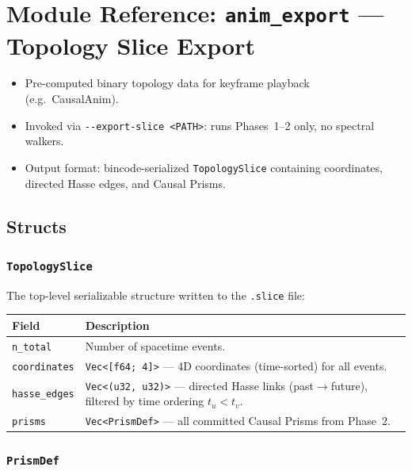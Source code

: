 \documentclass[11pt, a4paper, openany]{book}
\newcommand{\code}[1]{\texttt{#1}}
\newcommand{\modname}[1]{\texttt{\bfseries\color{main}#1}}
\newenvironment{introduction}[1][Chapter Overview]{%
  \begin{tcolorbox}[
    enhanced,colback=structure!5,colframe=structure,
    colbacktitle=structure,coltitle=white,
    fonttitle=\small\bfseries,title={#1},
    arc=2pt,boxrule=0.7pt,
    left=8pt,right=8pt,top=6pt,bottom=6pt,
    before skip=12pt,after skip=12pt
  ]\itshape\begin{itemize}[leftmargin=*,itemsep=2pt,parsep=0pt]
}{%
  \end{itemize}\end{tcolorbox}
}
\begin{document}
\chapter{Module Reference: \modname{anim\_export} --- Topology Slice Export}

\begin{introduction}[Binary Export for External Renderers]
  \item Pre-computed binary topology data for keyframe playback (e.g.\ CausalAnim).
  \item Invoked via \code{-{}-export-slice <PATH>}: runs Phases~1--2 only, no spectral walkers.
  \item Output format: bincode-serialized \code{TopologySlice} containing coordinates, directed Hasse edges, and Causal Prisms.
\end{introduction}

\section{Structs}

\subsection{\code{TopologySlice}}

The top-level serializable structure written to the \code{.slice} file:

\begin{table}[H]
\centering
\begin{tabular}{@{} l p{9cm} @{}}
\toprule
\textbf{Field} & \textbf{Description} \\
\midrule
\code{n\_total}      & Number of spacetime events. \\
\code{coordinates}   & \code{Vec<[f64; 4]>} --- 4D coordinates (time-sorted) for all events. \\
\code{hasse\_edges}  & \code{Vec<(u32, u32)>} --- directed Hasse links (past$\to$future), filtered by time ordering $t_u < t_v$. \\
\code{prisms}        & \code{Vec<PrismDef>} --- all committed Causal Prisms from Phase~2. \\
\bottomrule
\end{tabular}
\end{table}

\subsection{\code{PrismDef}}
\end{document}
